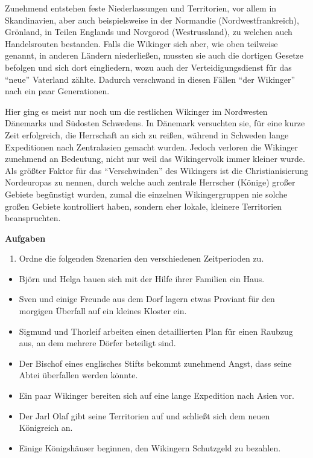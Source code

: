 \documentclass[12pt,a4paper,ngerman,openany]{book}
\newcommand{\aufgaben}[1]{
  \begin{tcolorbox}
    \textbf{Aufgaben}
    \begin{enumerate}
      #1
    \end{enumerate}
  \end{tcolorbox}
} %
\begin{document}
\begin{tcolorbox}[sharp corners, title=Ungefähr 900 bis 980]
Zunehmend entstehen feste Niederlassungen und Territorien, vor allem in Skandinavien, aber auch beispielsweise in der Normandie (Nordwestfrankreich), Grönland, in Teilen Englands und Novgorod (Westrussland), zu welchen auch Handelsrouten bestanden. Falls die Wikinger sich aber, wie oben teilweise genannt, in anderen Ländern niederließen, mussten sie auch die dortigen Gesetze befolgen und sich dort eingliedern, wozu auch der Verteidigungsdienst für das “neue” Vaterland zählte. Dadurch verschwand in diesen Fällen “der Wikinger” nach ein paar Generationen.
\end{tcolorbox}

\begin{tcolorbox}[sharp corners, title=Ungefähr 980 bis 1066]
Hier ging es meist nur noch um die restlichen Wikinger im Nordwesten Dänemarks und Südosten Schwedens. In Dänemark versuchten sie, für eine kurze Zeit erfolgreich, die Herrschaft an sich zu reißen, während in Schweden lange Expeditionen nach Zentralasien gemacht wurden. Jedoch verloren die Wikinger zunehmend an Bedeutung, nicht nur weil das Wikingervolk immer kleiner wurde. Als größter Faktor für das “Verschwinden” des Wikingers ist die Christianisierung Nordeuropas zu nennen, durch welche auch zentrale Herrscher (Könige) großer Gebiete begünstigt wurden, zumal die einzelnen Wikingergruppen nie solche großen Gebiete kontrolliert haben, sondern eher lokale, kleinere Territorien beanspruchten.
\end{tcolorbox}

\vspace{0.66cm}

\aufgaben{
  \item Ordne die folgenden Szenarien den verschiedenen Zeitperioden zu.
}

\begin{itemize}
\item Björn und Helga bauen sich mit der Hilfe ihrer Familien ein Haus.
\item Sven und einige Freunde aus dem Dorf lagern etwas Proviant für den morgigen Überfall auf ein kleines Kloster ein.
\item Sigmund und Thorleif arbeiten einen detaillierten Plan für einen Raubzug aus, an dem mehrere Dörfer beteiligt sind.
\item Der Bischof eines englisches Stifts bekommt zunehmend Angst, dass seine Abtei überfallen werden könnte.
\item Ein paar Wikinger bereiten sich auf eine lange Expedition nach Asien vor.
\item Der Jarl Olaf gibt seine Territorien auf und schließt sich dem neuen Königreich an.
\item Einige Königshäuser beginnen, den Wikingern Schutzgeld zu bezahlen.
\end{itemize}
\end{document}
